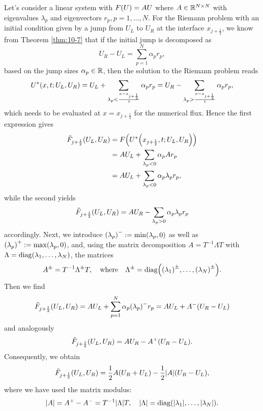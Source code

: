 \begin{example}
	Let's consider a linear system with \(F\parentheses*{U} = AU\) where \(A \in \mathbb{R}^{N \times N}\) with eigenvalues \(\lambda_p\) and eigenvectors \(r_p, p = 1, \ldots, N\).
	For the Riemann problem with an initial condition given by a jump from \(U_L\) to \(U_R\) at the interface \(x_{j + \frac{1}{2}}\), we know from Theorem \ref{thm:10-7} that if the initial jump is decomposed as
	\[
		U_R - U_L = \sum_{p = 1}^N \alpha_p r_p,
	\]
	based on the jump sizes \(\alpha_p \in \mathbb{R}\), then the solution to the Riemann problem reads
	\[
		U^*\parentheses*{x, t; U_L, U_R} = U_L + \sum_{\lambda_p < \frac{x - x_{j + \frac{1}{2}}}{t}}\alpha_p r_p = U_R - \sum_{\lambda_p > \frac{x - x_{j + \frac{1}{2}}}{t}}\alpha_p r_p,
	\]
	which needs to be evaluated at \(x = x_{j + \frac{1}{2}}\) for the numerical flux.
	Hence the first expression gives
	\begin{align*}
		\tilde{F}_{j + \frac{1}{2}}\parentheses*{U_L, U_R} &= F\parentheses*{U^*\parentheses*{x_{j + \frac{1}{2}}, t; U_L, U_R}}\\
		&= AU_L + \sum_{\lambda_p < 0}\alpha_p Ar_p\\
		&= AU_L + \sum_{\lambda_p < 0}\alpha_p \lambda_p r_p,
	\end{align*}
	while the second yields
	\[
		\tilde{F}_{j + \frac{1}{2}}\parentheses*{U_L, U_R} = AU_R - \sum_{\lambda_p > 0}\alpha_p \lambda_p r_p
	\]
	accordingly.
	Next, we introduce \(\parentheses*{\lambda_p}^- := \min\parentheses*{\lambda_p, 0}\) as well as \(\parentheses*{\lambda_p}^+ := \max\parentheses*{\lambda_p, 0}\), and, using the matrix decomposition \(A = T^{-1}\Lambda T\) with \(\Lambda = \diag\parentheses*{\lambda_1, \ldots, \lambda_N}\), the matrices
	\[
		A^\pm = T^{-1}\Lambda^\pm T, \quad \text{where} \quad \Lambda^\pm = \diag\parentheses*{\parentheses*{\lambda_1}^\pm, \ldots, \parentheses*{\lambda_N}^\pm}.
	\]
	Then we find
	\[
		\tilde{F}_{j + \frac{1}{2}}\parentheses*{U_L, U_R} = AU_L + \sum_{p = 1}^N \alpha_p \parentheses*{\lambda_p}^- r_p = AU_L + A^- \parentheses*{U_R - U_L}
	\]
	and analogously
	\[
		\tilde{F}_{j + \frac{1}{2}}\parentheses*{U_L, U_R} = AU_R - A^+ \parentheses*{U_R - U_L}.
	\]
	Consequently, we obtain
	\[
		\tilde{F}_{j + \frac{1}{2}}\parentheses*{U_L, U_R} = \frac{1}{2}A\parentheses*{U_R + U_L} - \frac{1}{2}\absolute*{A}\parentheses*{U_R - U_L},
	\]
	where we have used the matrix modulus:
	\[
		\absolute*{A} = A^+ - A^- = T^{-1}\absolute*{\Lambda}T, \quad \absolute*{\Lambda} = \diag\parentheses*{\absolute*{\lambda_1}, \ldots, \absolute*{\lambda_N}}.
\]
\end{example}
